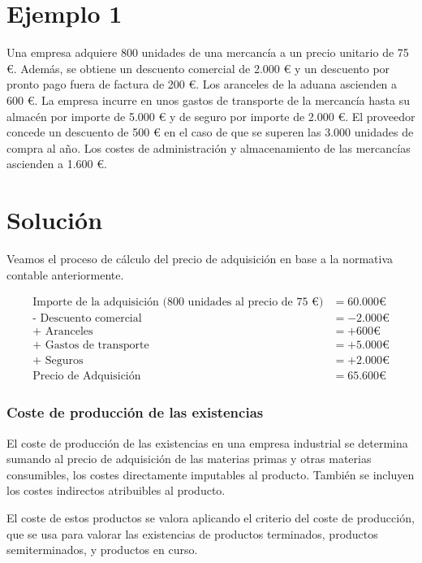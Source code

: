\documentclass{article}
\begin{document}
\section*{Ejemplo 1}

Una empresa adquiere 800 unidades de una mercancía a un precio unitario de 75 €. Además, se obtiene un descuento comercial de 2.000 € y un descuento por pronto pago fuera de factura de 200 €. Los aranceles de la aduana ascienden a 600 €. La empresa incurre en unos gastos de transporte de la mercancía hasta su almacén por importe de 5.000 € y de seguro por importe de 2.000 €. El proveedor concede un descuento de 500 € en el caso de que se superen las 3.000 unidades de compra al año. Los costes de administración y almacenamiento de las mercancías ascienden a 1.600 €.

\section*{Solución}

Veamos el proceso de cálculo del precio de adquisición en base a la normativa contable anteriormente.

\begin{align*}
\text{Importe de la adquisición (800 unidades al precio de 75 €)} &= 60.000 € \\
\text{- Descuento comercial} &= -2.000 € \\
\text{+ Aranceles} &= +600 € \\
\text{+ Gastos de transporte} &= +5.000 € \\
\text{+ Seguros} &= +2.000 € \\
\text{Precio de Adquisición} &= 65.600 €
\end{align*}

\subsubsection{Coste de producción de las existencias}

El coste de producción de las existencias en una empresa industrial se determina sumando al precio de adquisición de las materias primas y otras materias consumibles, los costes directamente imputables al producto. También se incluyen los costes indirectos atribuibles al producto.

El coste de estos productos se valora aplicando el criterio del coste de producción, que se usa para valorar las existencias de productos terminados, productos semiterminados, y productos en curso.
\end{document}
